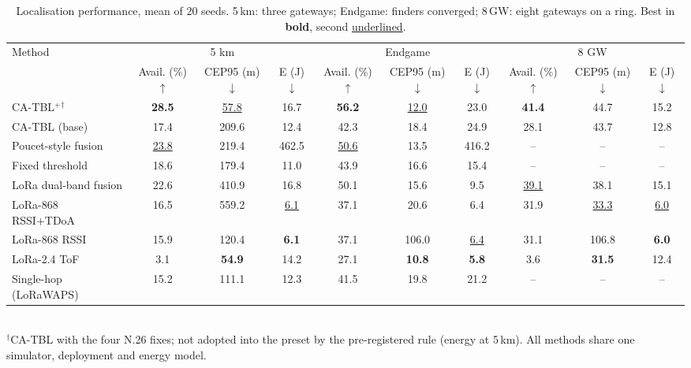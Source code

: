 
\begin{table}[t]
\centering
\small
\setlength{\tabcolsep}{4.5pt}
\caption{Localisation performance, mean of 20 seeds. 5\,km: three gateways; Endgame: finders converged; 8\,GW: eight gateways on a ring. Best in \textbf{bold}, second \underline{underlined}.}
\label{tab:performance}
\begin{tabular}{lccccccccc}
\toprule
Method & \multicolumn{3}{c}{5 km} & \multicolumn{3}{c}{Endgame} & \multicolumn{3}{c}{8 GW} \\
\cmidrule(lr){2-4}\cmidrule(lr){5-7}\cmidrule(lr){8-10}
 & Avail. (\%)$\uparrow$ & CEP95 (m)$\downarrow$ & E (J)$\downarrow$ & Avail. (\%)$\uparrow$ & CEP95 (m)$\downarrow$ & E (J)$\downarrow$ & Avail. (\%)$\uparrow$ & CEP95 (m)$\downarrow$ & E (J)$\downarrow$ \\
\midrule
CA-TBL$^{+}$$^{\dagger}$ & \textbf{28.5} & \underline{57.8} & 16.7 & \textbf{56.2} & \underline{12.0} & 23.0 & \textbf{41.4} & 44.7 & 15.2 \\
CA-TBL (base) & 17.4 & 209.6 & 12.4 & 42.3 & 18.4 & 24.9 & 28.1 & 43.7 & 12.8 \\
\midrule
Poucet-style fusion & \underline{23.8} & 219.4 & 462.5 & \underline{50.6} & 13.5 & 416.2 & -- & -- & -- \\
Fixed threshold & 18.6 & 179.4 & 11.0 & 43.9 & 16.6 & 15.4 & -- & -- & -- \\
LoRa dual-band fusion & 22.6 & 410.9 & 16.8 & 50.1 & 15.6 & 9.5 & \underline{39.1} & 38.1 & 15.1 \\
LoRa-868 RSSI+TDoA & 16.5 & 559.2 & \underline{6.1} & 37.1 & 20.6 & 6.4 & 31.9 & \underline{33.3} & \underline{6.0} \\
LoRa-868 RSSI & 15.9 & 120.4 & \textbf{6.1} & 37.1 & 106.0 & \underline{6.4} & 31.1 & 106.8 & \textbf{6.0} \\
LoRa-2.4 ToF & 3.1 & \textbf{54.9} & 14.2 & 27.1 & \textbf{10.8} & \textbf{5.8} & 3.6 & \textbf{31.5} & 12.4 \\
Single-hop (LoRaWAPS) & 15.2 & 111.1 & 12.3 & 41.5 & 19.8 & 21.2 & -- & -- & -- \\
\bottomrule
\end{tabular}
\\[2pt]\footnotesize $^{\dagger}$CA-TBL with the four N.26 fixes; not adopted into the preset by the pre-registered rule (energy at 5\,km). All methods share one simulator, deployment and energy model.
\end{table}

